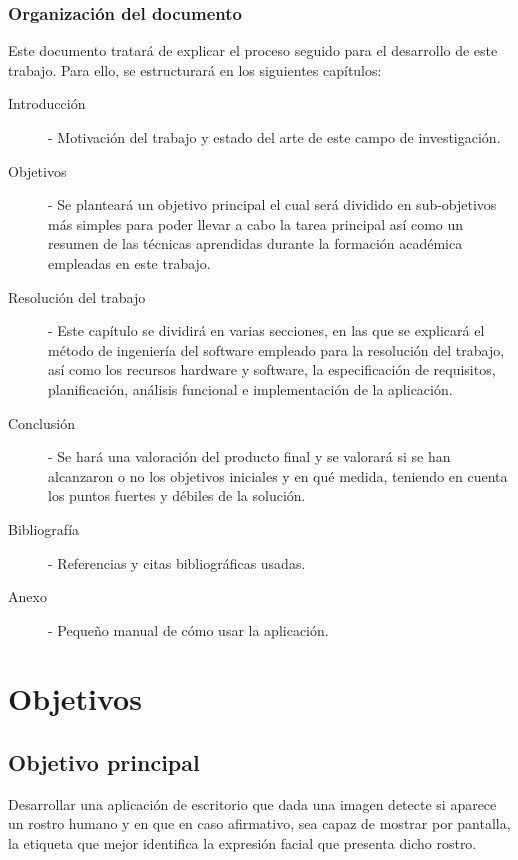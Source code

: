 \documentclass[a4paper,11pt]{book}
\begin{document}
\subsection{Organización del documento}
Este documento tratará de explicar el proceso seguido para el desarrollo de este trabajo. Para ello, se estructurará en los siguientes capítulos:\\
\begin{description}
	\item [Introducción] - Motivación del trabajo y estado del arte de este campo de investigación.  
	\item [Objetivos] - Se planteará un objetivo principal el cual será dividido en sub-objetivos más simples para poder llevar a cabo la tarea principal así como un resumen de las técnicas aprendidas durante la formación académica empleadas en este trabajo.
	\item [Resolución del trabajo] - Este capítulo se dividirá en varias secciones, en las que se explicará el método de ingeniería del software empleado para la resolución del trabajo, así como los recursos hardware y software, la especificación de requisitos, planificación, análisis funcional e implementación de la aplicación.
	\item [Conclusión] - Se hará una valoración del producto final y se valorará si se han alcanzaron o no los objetivos iniciales y en qué medida, teniendo en cuenta los puntos fuertes y débiles de la solución.
	\item [Bibliografía] - Referencias y citas bibliográficas usadas.
	\item [Anexo] - Pequeño manual de cómo usar la aplicación.
\end{description} 

\chapter{Objetivos}
\section{Objetivo principal}
Desarrollar una aplicación de escritorio que dada una imagen detecte si aparece un rostro humano y en que en caso afirmativo, sea capaz de mostrar por pantalla, la etiqueta que mejor identifica la expresión facial que presenta dicho rostro.\\
\end{document}
